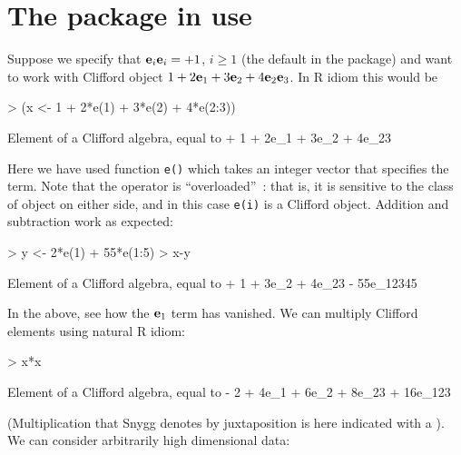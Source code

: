 \documentclass{birkjour}
\theoremstyle{definition}
\theoremstyle{remark}
\numberwithin{equation}{section}
\begin{document}
\section{The package in use}

Suppose we specify that ${\bf e}_{i}{\bf e}_{i}=+1$,
  $i\geqslant 1$ (the default in the package) and want to work with
Clifford object $1+2{\bf e}_{1}+3{\bf e}_{2}+4{\bf e}_{2}{\bf e}_{3}$.  In R idiom this
would be

\begin{Schunk}
\begin{Sinput}
> (x <- 1 + 2*e(1) + 3*e(2) + 4*e(2:3))
\end{Sinput}
\begin{Soutput}
Element of a Clifford algebra, equal to
+ 1 + 2e_1 + 3e_2 + 4e_23
\end{Soutput}
\end{Schunk}
%
Here we have used function {\tt e()} which takes an integer vector
that specifies the term.  Note that the {\tt *}
  operator is ``overloaded''~\cite{stroustrup2013}: that is, it is
  sensitive to the class of object on either side, and in this case
  {\tt e(i)} is a Clifford object.  Addition and subtraction work as
expected:
%
\begin{Schunk}
\begin{Sinput}
> y <- 2*e(1) + 55*e(1:5)
> x-y
\end{Sinput}
\begin{Soutput}
Element of a Clifford algebra, equal to
+ 1 + 3e_2 + 4e_23 - 55e_12345
\end{Soutput}
\end{Schunk}
%
In the above, see how the ${\bf e}_{1}$ term has vanished.  We can
multiply Clifford elements using natural R idiom:

\begin{Schunk}
\begin{Sinput}
> x*x
\end{Sinput}
\begin{Soutput}
Element of a Clifford algebra, equal to
- 2 + 4e_1 + 6e_2 + 8e_23 + 16e_123
\end{Soutput}
\end{Schunk}
%
(Multiplication that Snygg denotes by juxtaposition is here indicated
with a {\tt *}).  We can consider arbitrarily high dimensional data:
\end{document}
